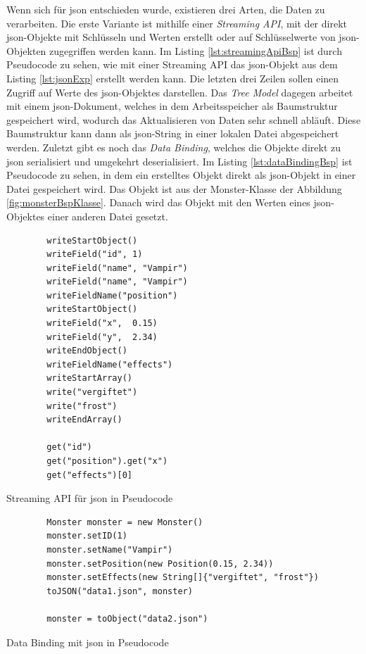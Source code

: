 Wenn sich für \ac{json} entschieden wurde, existieren drei Arten, die Daten zu verarbeiten. Die erste Variante ist mithilfe einer \textit{Streaming API}, mit der direkt \ac{json}-Objekte mit Schlüsseln und Werten erstellt oder auf Schlüsselwerte von \ac{json}-Objekten zugegriffen werden kann. Im Listing \ref{lst:streamingApiBsp} ist durch Pseudocode zu sehen, wie mit einer Streaming API das \ac{json}-Objekt aus dem Listing \ref{lst:jsonExp} erstellt werden kann. Die letzten drei Zeilen sollen einen Zugriff auf Werte des \ac{json}-Objektes darstellen.\cite{tutorialspointJacksonStreaming} Das \textit{Tree Model} dagegen arbeitet mit einem \ac{json}-Dokument, welches in dem Arbeitsspeicher als Baumstruktur gespeichert wird, wodurch das Aktualisieren von Daten sehr schnell abläuft. Diese Baumstruktur kann dann als \ac{json}-String in einer lokalen Datei abgespeichert werden. Zuletzt gibt es noch das \textit{Data Binding}, welches die Objekte direkt zu \ac{json} serialisiert und umgekehrt deserialisiert. Im Listing \ref{lst:dataBindingBsp} ist Pseudocode zu sehen, in dem ein erstelltes Objekt direkt als \ac{json}-Objekt in einer Datei gespeichert wird. Das Objekt ist aus der Monster-Klasse der Abbildung \ref{fig:monsterBspKlasse}. Danach wird das Objekt mit den Werten eines \ac{json}-Objektes einer anderen Datei gesetzt.\cite{tutorialspointJacksonData}\cite{tutorialspointJacksonOverview}

\begin{listing}[htp]
    \begin{verbatim} 
        writeStartObject()
        writeField("id", 1)
        writeField("name", "Vampir")
        writeField("name", "Vampir")
        writeFieldName("position")
        writeStartObject()
        writeField("x",  0.15) 
        writeField("y",  2.34) 
        writeEndObject()
        writeFieldName("effects")
        writeStartArray()
        write("vergiftet") 
        write("frost")
        writeEndArray()

        get("id")
        get("position").get("x")
        get("effects")[0]
    \end{verbatim}
    \caption{Streaming API für \ac{json} in Pseudocode}
    \label{lst:streamingApiBsp}
\end{listing}

\begin{listing}[htp]
    \begin{verbatim} 
        Monster monster = new Monster()
        monster.setID(1)
        monster.setName("Vampir")
        monster.setPosition(new Position(0.15, 2.34))
        monster.setEffects(new String[]{"vergiftet", "frost"})
        toJSON("data1.json", monster)

        monster = toObject("data2.json")
    \end{verbatim}
    \caption{Data Binding mit \ac{json} in Pseudocode}
    \label{lst:dataBindingBsp}
\end{listing}

